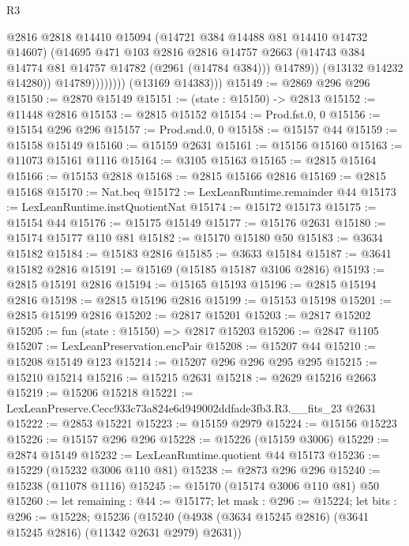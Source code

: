 \begin{lexlean}{R3}
\begin{coremodule}
                            @2816
                            @2818
                            @14410
                            @15094
                            (@14721 @384 @14488 @81 @14410 @14732 @14607)
                            (@14695
                              @471
                              @103
                              @2816
                              @2816
                              @14757
                              @2663
                              (@14743 @384 @14774 @81 @14757 @14782 (@2961 (@14784 @384)))
                              @14789))
                          (@13132 @14232 @14280))
                        @14789))))))))
        (@13169 @14383)))
@15149 := @2869 @296 @296
@15150 := @2870 @15149
@15151 := (state : @15150) -> @2813
@15152 := @11448 @2816
@15153 := @2815 @15152
@15154 := Prod.fst.{0, 0}
@15156 := @15154 @296 @296
@15157 := Prod.snd.{0, 0}
@15158 := @15157 @44
@15159 := @15158 @15149
@15160 := @15159 @2631
@15161 := @15156 @15160
@15163 := @11073 @15161 @1116
@15164 := @3105 @15163
@15165 := @2815 @15164
@15166 := @15153 @2818
@15168 := @2815 @15166 @2816
@15169 := @2815 @15168
@15170 := Nat.beq
@15172 := LexLeanRuntime.remainder @44
@15173 := LexLeanRuntime.instQuotientNat
@15174 := @15172 @15173
@15175 := @15154 @44
@15176 := @15175 @15149
@15177 := @15176 @2631
@15180 := @15174 @15177 @110 @81
@15182 := @15170 @15180 @50
@15183 := @3634 @15182
@15184 := @15183 @2816
@15185 := @3633 @15184
@15187 := @3641 @15182 @2816
@15191 := @15169 (@15185 @15187 @3106 @2816)
@15193 := @2815 @15191 @2816
@15194 := @15165 @15193
@15196 := @2815 @15194 @2816
@15198 := @2815 @15196 @2816
@15199 := @15153 @15198
@15201 := @2815 @15199 @2816
@15202 := @2817 @15201
@15203 := @2817 @15202
@15205 := fun (state : @15150) => @2817 @15203
@15206 := @2847 @1105
@15207 := LexLeanPreservation.encPair
@15208 := @15207 @44
@15210 := @15208 @15149 @123
@15214 := @15207 @296 @296 @295 @295
@15215 := @15210 @15214
@15216 := @15215 @2631
@15218 := @2629 @15216 @2663
@15219 := @15206 @15218
@15221 := LexLeanPreserve.Cecc933c73a824e6d949002ddfade3fb3.R3.__fits_23 @2631
@15222 := @2853 @15221
@15223 := @15159 @2979
@15224 := @15156 @15223
@15226 := @15157 @296 @296
@15228 := @15226 (@15159 @3006)
@15229 := @2874 @15149
@15232 := LexLeanRuntime.quotient @44 @15173
@15236 := @15229 (@15232 @3006 @110 @81)
@15238 := @2873 @296 @296
@15240 := @15238 (@11078 @1116)
@15245 := @15170 (@15174 @3006 @110 @81) @50
@15260 := let remaining : @44 := @15177;
  let mask : @296 := @15224;
  let bits : @296 := @15228;
  @15236 (@15240 (@4938 (@3634 @15245 @2816) (@3641 @15245 @2816) (@11342 @2631 @2979) @2631))

\end{coremodule}
\end{lexlean}
